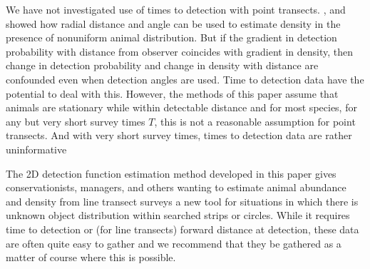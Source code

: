 \documentclass[useAMS,usenatbib,referee]{biom}
\begin{document}
We have not investigated use of times to detection with point transects. \cite{Marques+al:10a}, \cite{Cox+al:11} and \cite{Arranz+al:14} showed how radial distance and angle can be used to estimate density in the presence of nonuniform animal distribution. But if the gradient in detection probability with distance from observer coincides with gradient in density, then change in detection probability and change in density with distance are confounded even when detection angles are used. Time to detection data have the potential to deal with this. However, the methods of this paper assume that animals are stationary while within detectable distance and for most species, for any but very short survey times $T$, this is not a reasonable assumption for point transects. And with very short survey times, times to detection data are rather uninformative

The 2D detection function estimation method developed in this paper gives conservationists, managers, and others wanting to estimate animal abundance and density from line transect surveys a new tool for situations in which there is unknown object distribution within searched strips or circles. While it requires time to detection or (for line transects) forward distance at detection, these data are often quite easy to gather and we recommend that they be gathered as a matter of course where this is possible. 

\end{document}
